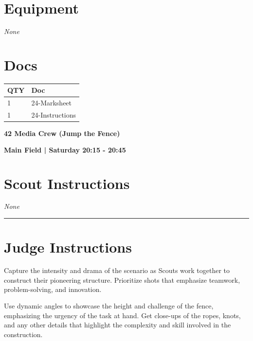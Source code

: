 \documentclass[10pt]{article}
\newcommand{\newtitle}[1]{\begin{center}{\Huge\bfseries #1 }\\ \vspace{5mm}\end{center}}
\newcommand{\newsubtitle}[1]{\begin{center}{\color{grey}\Large\bfseries #1 }\\ \vspace{5mm}\end{center}}
\begin{document}
	\begin{multicols}{2}

		\section*{\faWrench \: Equipment}

				\textit{None}
		
		\vfill\null
		\columnbreak

			\section*{\faFile \: Docs}
		 	\begin{center}
			\begin{tabular}{p{2cm}p{4cm}}

			\textbf{QTY} & \textbf{Doc} \\\toprule
										1&24-Marksheet\\\midrule
										1&24-Instructions\\\midrule
							\end{tabular}
			\end{center}
	

		\vfill\null

		\end{multicols}



	\vspace{1cm}


	\clearpage
		\newtitle{42 Media Crew (Jump the Fence) }
	\newsubtitle{Main Field | Saturday 20:15 - 20:45}
		\setcounter{section}{41}
	\section*{Scout Instructions}
		\textit{None}
	
	\vspace{0.5cm}
	\hrule
	\vspace{0.5cm}

		\section*{Judge Instructions}
		Capture the intensity and drama of the scenario as Scouts work together to construct their pioneering structure. Prioritize shots that emphasize teamwork, problem-solving, and innovation. 

Use dynamic angles to showcase the height and challenge of the fence, emphasizing the urgency of the task at hand. Get close-ups of the ropes, knots, and any other details that highlight the complexity and skill involved in the construction. 
\end{document}

